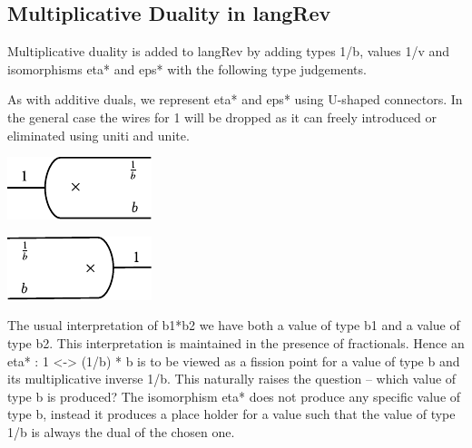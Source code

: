 \documentclass[preprint]{sigplanconf}
\begin{document}
\subsection{Multiplicative Duality in {{langRev}} }

Multiplicative duality is added to {{langRev}} by adding types
{{1/b}}, values {{1/v}} and isomorphisms {{eta*}} and {{eps*}} with
the following type judgements.

%

\vspace{-15pt}
\begin{multicols}{2}

\end{multicols}

As with additive duals, we represent {{eta*}} and {{eps*}} using
U-shaped connectors. In the general case the wires for {{1}} will be
dropped as it can freely introduced or eliminated using {{uniti}} and
{{unite}}. 

\begin{multicols}{2}
\begin{center}
  \includegraphics{diagrams/eta_times.pdf}
\end{center}
  
\begin{center}
  \includegraphics{diagrams/eps_times.pdf}
\end{center}
\end{multicols}

The usual interpretation of {{b1*b2}} we have both a value of type
{{b1}} and a value of type {{b2}}. This interpretation is maintained
in the presence of fractionals. Hence an {{eta* : 1 <-> (1/b) * b}} is
to be viewed as a fission point for a value of type {{b}} and its
multiplicative inverse {{1/b}}. This naturally raises the question --
which value of type {{b}} is produced? The isomorphism {{eta*}} does
not produce any specific value of type {{b}}, instead it produces a
place holder for a value such that the value of type {{1/b}} is
always the dual of the chosen one. 
\end{document}
